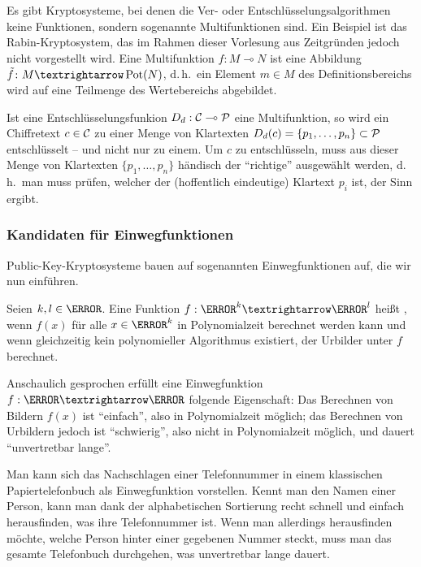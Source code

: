   
   \begin{remark}
   Es gibt Kryptosysteme, bei denen die Ver- oder Entschlüsselungsalgorithmen keine Funktionen, sondern sogenannte Multifunktionen sind. Ein Beispiel ist das Rabin-Kryptosystem, das im Rahmen dieser Vorlesung aus Zeitgründen jedoch nicht vorgestellt wird. Eine Multifunktion $f\colon M \multimap N$ ist eine Abbildung $\tilde f\colon M → \Pot(N)$, d.\,h.~ein Element $m \in M$ des Definitionsbereichs wird auf eine Teilmenge des Wertebereichs abgebildet.

   Ist eine Entschlüsselungsfunkion $D_d: \mathcal C \multimap \mathcal P$ eine Multifunktion, so wird ein Chiffretext $c \in \mathcal C$ zu einer Menge von Klartexten $D_d(c) = \{p_1, \dots, p_n\} \subset \mathcal P$ entschlüsselt -- und nicht nur zu einem. Um $c$ zu entschlüsseln, muss aus dieser Menge von Klartexten $\{p_1, \dots, p_n\}$ händisch der \enquote{richtige} ausgewählt werden, d.\,h.~man muss prüfen, welcher der (hoffentlich eindeutige) Klartext $p_i$ ist, der Sinn ergibt.
   \end{remark}
  
  \subsubsection{Kandidaten für Einwegfunktionen}
  
  Public-Key-Kryptosysteme bauen auf sogenannten Einwegfunktionen auf, die wir nun einführen.
  
  \begin{definition}
   Seien $k, l \in \N$. Eine Funktion $f: \N^k → \N^l$ heißt , wenn $f(x)$ für alle $x \in \N^k$ in Polynomialzeit berechnet werden kann und wenn gleichzeitig kein polynomieller Algorithmus existiert, der Urbilder unter $f$ berechnet.
  \end{definition}

  Anschaulich gesprochen erfüllt eine Einwegfunktion $f: \N → \N$ folgende Eigenschaft: Das Berechnen von Bildern $f(x)$ ist \enquote{einfach}, also in Polynomialzeit möglich; das Berechnen von Urbildern jedoch ist \enquote{schwierig}, also nicht in Polynomialzeit möglich, und dauert \enquote{unvertretbar lange}.
  
   \begin{remark}
  Man kann sich das Nachschlagen einer Telefonnummer in einem klassischen Papiertelefonbuch als Einwegfunktion vorstellen. Kennt man den Namen einer Person, kann man dank der alphabetischen Sortierung recht schnell und einfach herausfinden, was ihre Telefonnummer ist. Wenn man allerdings herausfinden möchte, welche Person hinter einer gegebenen Nummer steckt, muss man das gesamte Telefonbuch durchgehen, was unvertretbar lange dauert.
  \end{remark}
  

